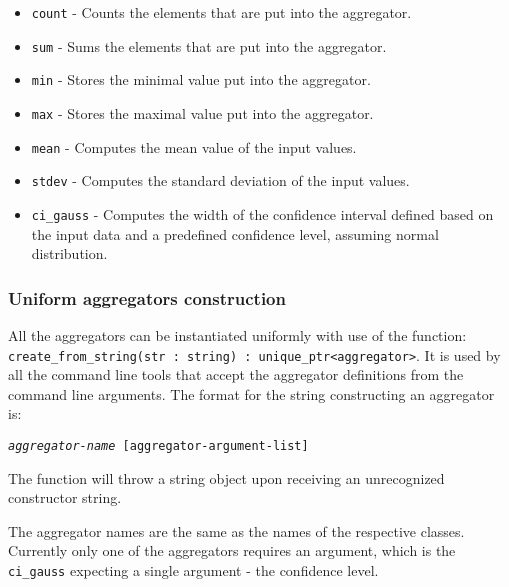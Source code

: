 	\begin{itemize}
		\item \texttt{count} - Counts the elements that are put into the aggregator.
		\item \texttt{sum} - Sums the elements that are put into the aggregator.
		\item \texttt{min} - Stores the minimal value put into the aggregator.
		\item \texttt{max} - Stores the maximal value put into the aggregator.
		\item \texttt{mean} - Computes the mean value of the input values.
		\item \texttt{stdev} - Computes the standard deviation of the input values.
		\item \texttt{ci\_gauss} - Computes the width of the confidence
			interval defined based on the input data and a predefined
			confidence level, assuming normal distribution.
	\end{itemize}

	\subsubsection{Uniform aggregators construction}
	All the aggregators can be instantiated uniformly with use of the function:
	\texttt{create\_from\_string(str : string) : unique\_ptr<aggregator>}.
	It is used by all the command line tools that accept the aggregator definitions
	from the command line arguments. The format for the string constructing an
	aggregator is:
	\begin{center}
		\texttt{\textit{aggregator-name} [\texttt{aggregator-argument-list}]}
	\end{center}
	The function will throw a string object upon receiving an unrecognized constructor
	string.

	The aggregator names are the same as the names of the respective classes. Currently
	only one of the aggregators requires an argument, which is the \texttt{ci\_gauss}
	expecting a single argument - the confidence level.


